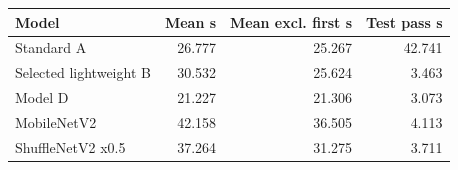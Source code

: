 \begin{tabular}{lrrr}
\toprule
Model & Mean s & Mean excl. first s & Test pass s \\
\midrule
Standard A & 26.777 & 25.267 & 42.741 \\
Selected lightweight B & 30.532 & 25.624 & 3.463 \\
Model D & 21.227 & 21.306 & 3.073 \\
MobileNetV2 & 42.158 & 36.505 & 4.113 \\
ShuffleNetV2 x0.5 & 37.264 & 31.275 & 3.711 \\
\bottomrule
\end{tabular}
